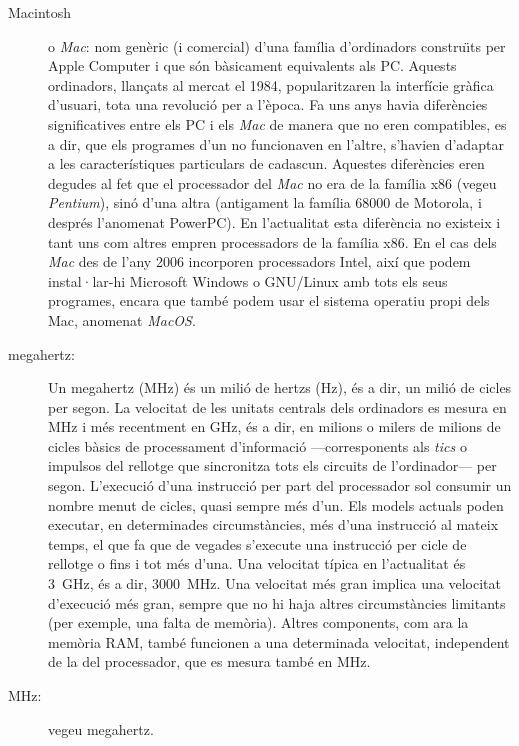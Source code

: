 \begin{description}
\item[Macintosh] o \emph{Mac}: nom genèric (i comercial) d'una família
  d'ordinadors constru\"{\i}ts per Apple Computer i que són bàsicament
  equivalents als PC. Aquests ordinadors, llançats al mercat el 1984,
  popularitzaren la interfície gràfica d'usuari, tota una revolució
  per a l'època. Fa uns anys havia diferències significatives entre
  els PC i els \emph{Mac} de manera que no eren compatibles, es a dir,
  que els programes d'un no funcionaven en l'altre, s'havien d'adaptar
  a les característiques particulars de cadascun. Aquestes diferències
  eren degudes al fet que el processador del \emph{Mac} no era de la
  família x86 (vegeu \emph{Pentium}), sinó d'una altra (antigament la
  família 68000 de Motorola, i després l'anomenat PowerPC). En
  l'actualitat esta diferència no existeix i tant uns com altres
  empren processadors de la família x86. En el cas dels \emph{Mac} des
  de l'any 2006 incorporen processadors Intel, així que podem
  instal·lar-hi Microsoft Windows o GNU/Linux amb tots els seus
  programes, encara que també podem usar el sistema operatiu propi
  dels Mac, anomenat \emph{MacOS}.
  
\item[megahertz:] Un megahertz (MHz) és un milió de hertzs (Hz),
  és a dir, un milió de cicles per segon. La velocitat de les
  unitats centrals dels ordinadors es mesura en MHz i més recentment
  en GHz, és a dir, en milions o milers de milions de cicles
  bàsics de processament d'informació ---corresponents als \emph{tics}
  o impulsos del rellotge que sincronitza tots els circuits de
  l'ordinador--- per segon.  L'execució d'una instrucció per part del
  processador sol consumir un nombre menut de cicles, quasi sempre
  més d'un. Els models actuals poden executar, en determinades
  circumstàncies, més d'una instrucció al mateix temps, el que fa que de
  vegades s'execute una instrucció per cicle de rellotge o fins i tot
  més d'una.  Una velocitat típica en l'actualitat és 3~GHz, és a
  dir, 3000~MHz. Una velocitat més gran implica una velocitat
  d'execució més gran, sempre que no hi haja altres circumstàncies
  limitants (per exemple, una falta de memòria).  Altres components,
  com ara la memòria RAM, també funcionen a una determinada velocitat,
  independent de la del processador, que es mesura també en MHz.


\item[MHz:] vegeu megahertz.
  

\end{description}
